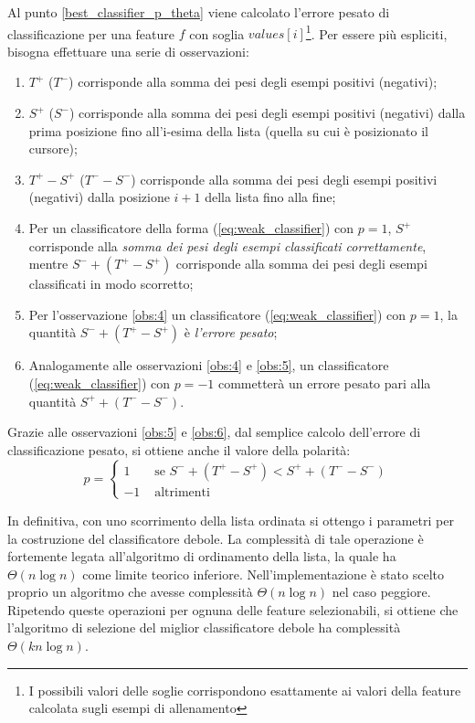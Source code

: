 \documentclass[a4paper,11pt,oneside]{article}
\begin{document}
			Al punto \ref{best_classifier_p_theta} viene calcolato l'errore pesato di classificazione per una feature $f$ con soglia $values[i]$\footnote{I possibili valori delle soglie corrispondono esattamente ai valori della feature calcolata sugli esempi di allenamento}. Per essere più espliciti, bisogna effettuare una serie di osservazioni:
			\begin{enumerate}
				\item \label{obs:1} $T^+$ ($T^-$) corrisponde alla somma dei pesi degli esempi positivi (negativi);
				\item \label{obs:2} $S^+$ ($S^-$) corrisponde alla somma dei pesi degli esempi positivi (negativi) dalla prima posizione fino all'i-esima della lista (quella su cui è posizionato il cursore);
				\item \label{obs:3} $T^+ - S^+$ ($T^- - S^-$) corrisponde alla somma dei pesi degli esempi positivi (negativi) dalla posizione $i+1$ della lista fino alla fine;
				\item \label{obs:4} Per un classificatore della forma (\ref{eq:weak_classifier}) con $p = 1$, $S^+$ corrisponde alla \emph{somma dei pesi degli esempi classificati correttamente}, mentre $S^- + (T^+ - S^+)$ corrisponde alla somma dei pesi degli esempi classificati in modo scorretto;
				\item \label{obs:5} Per l'osservazione \ref{obs:4} un classificatore (\ref{eq:weak_classifier}) con $p = 1$, la quantità $S^- + (T^+ - S^+)$ è \emph{l'errore pesato};
				\item \label{obs:6} Analogamente alle osservazioni \ref{obs:4} e \ref{obs:5}, un classificatore (\ref{eq:weak_classifier}) con $p = -1$ commetterà un errore pesato pari alla quantità $S^+ + (T^- - S^-)$.
			\end{enumerate}

			Grazie alle osservazioni \ref{obs:5} e \ref{obs:6}, dal semplice calcolo dell'errore di classificazione pesato, si ottiene anche il valore della polarità:
			\begin{equation}
				p = \begin{cases}
					1 & \text{ se } S^- + (T^+ - S^+) < S^+ + (T^- - S^-) \\
					-1 & \text{ altrimenti }
				\end{cases}
			\end{equation}

			In definitiva, con uno scorrimento della lista ordinata si ottengo i parametri per la costruzione del classificatore debole. La complessità di tale operazione è fortemente legata all'algoritmo di ordinamento della lista, la quale ha $\Theta(n\log n)$ come limite teorico inferiore. Nell'implementazione è stato scelto proprio un algoritmo che avesse complessità $\Theta(n\log n)$ nel caso peggiore. Ripetendo queste operazioni per ognuna delle feature selezionabili, si ottiene che l'algoritmo di selezione del miglior classificatore debole ha complessità $\Theta(kn\log n)$.
\end{document}
